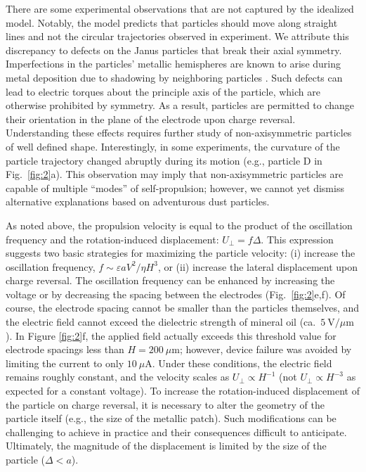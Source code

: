 There are some experimental observations that are not captured by the idealized model.
Notably, the model predicts that particles should move along straight lines and not the circular trajectories observed in experiment.
We attribute this discrepancy to defects on the Janus particles that break their axial symmetry.
Imperfections in the particles' metallic hemispheres are known to arise during metal deposition due to shadowing by neighboring particles \cite{Pawar2008}.
Such defects can lead to electric torques about the principle axis of the particle, which are otherwise prohibited by symmetry.
As a result, particles are permitted to change their orientation in the plane of the electrode upon charge reversal.
Understanding these effects requires further study of non-axisymmetric particles of well defined shape.
Interestingly, in some experiments, the curvature of the particle trajectory changed abruptly during its motion (e.g., particle D in Fig.~\ref{fig:2}a). 
This observation may imply that non-axisymmetric particles are capable of multiple ``modes'' of self-propulsion; however, we cannot yet dismiss alternative explanations based on adventurous dust particles.

As noted above, the propulsion velocity is equal to the product of the oscillation frequency and the rotation-induced displacement: $U_{\perp}=f\Delta$.
This expression suggests two basic strategies for maximizing the particle velocity: (i) increase the oscillation frequency, $f\sim\varepsilon a V^2/\eta H^3$, or (ii) increase the lateral displacement upon charge reversal.
The oscillation frequency can be enhanced by increasing the voltage or by decreasing the spacing between the electrodes (Fig.~\ref{fig:2}e,f).
Of course, the electrode spacing cannot be smaller than the particles themselves, and the electric field cannot exceed the dielectric strength of mineral oil (ca.~$5~\text{V/}\mu\text{m}$).
In Figure \ref{fig:2}f, the applied field actually exceeds this threshold value for electrode spacings less than $H=200~\mu\text{m}$; however, device failure was avoided by limiting the current to only $10~\mu\text{A}$.
Under these conditions, the electric field remains roughly constant, and the velocity scales as $U_{\perp}\propto H^{-1}$ (not $U_{\perp}\propto H^{-3}$ as expected for a constant voltage). 
To increase the rotation-induced displacement of the particle on charge reversal, it is necessary to alter the geometry of the particle itself (e.g., the size of the metallic patch). 
Such modifications can be challenging to achieve in practice and their consequences difficult to anticipate. 
Ultimately, the magnitude of the displacement is limited by the size of the particle ($\Delta < a$).

